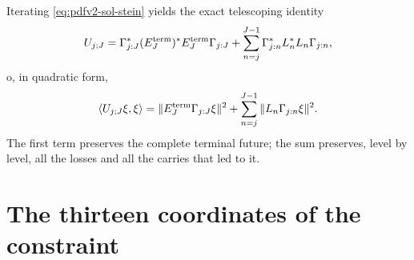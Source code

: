 Iterating \eqref{eq:pdfv2-sol-stein} yields the exact telescoping identity
\begin{equation}\label{eq:pdfv2-sol-telescopia-operatorial}
 U_{j;J}
 =\Gamma_{j:J}^*(E_J^{\rm term})^*E_J^{\rm term}\Gamma_{j:J}
  +\sum_{n=j}^{J-1}
   \Gamma_{j:n}^*L_n^*L_n\Gamma_{j:n},
\end{equation}
o, in quadratic form,
\begin{equation}\label{eq:pdfv2-sol-telescopia-normas}
 \langle U_{j;J}\xi,\xi\rangle
 =\|E_J^{\rm term}\Gamma_{j:J}\xi\|^2
  +\sum_{n=j}^{J-1}\|L_n\Gamma_{j:n}\xi\|^2.
\end{equation}
The first term preserves the complete terminal future; the sum preserves,
level by level, all the losses and all the carries that led to it.

\iffalse
\section{The thirteen coordinates of the constraint}
\label{sec:pdfv2-sol-trece}

